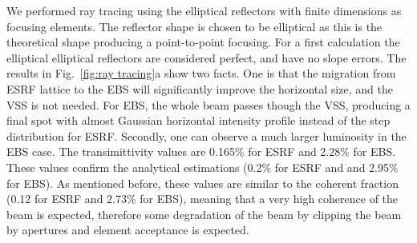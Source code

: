 \documentclass{iucr}              %
\newcommand{\inred}[1]{{\color{red}#1}}
\begin{document}


We performed ray tracing using the elliptical reflectors with finite dimensions as focusing elements. The reflector shape is chosen to be elliptical as this is the theoretical shape producing a point-to-point focusing. For a first calculation  the elliptical elliptical reflectors are considered perfect, and have no slope errors. 
The results in Fig.~\ref{fig:ray tracing}a show two facts. One is that the migration from ESRF lattice to the EBS will significantly improve the horizontal size, and the VSS is not needed. For EBS, the whole beam passes though the VSS, producing a final spot with almost Gaussian horizontal intensity profile instead of the step distribution for ESRF. Secondly, one can observe a much larger luminosity in the EBS case. The transimittivity values are 0.165\% for ESRF and 2.28\% for EBS. These values confirm the analytical estimations (0.2\% for ESRF and and 2.95\% for EBS). As mentioned before, these values are similar to the coherent fraction \cite{coherentfraction} (0.12 for ESRF and 2.73\% for EBS), meaning that a very high coherence of the beam is expected, therefore some degradation of the beam by clipping the beam by apertures and element acceptance is expected. 
\end{document}
